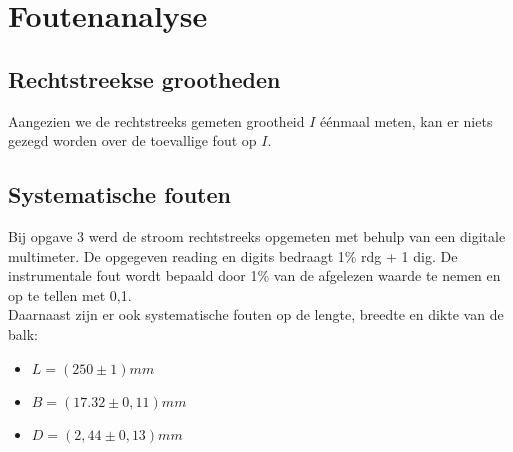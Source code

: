 \section{Foutenanalyse}
\subsection{Rechtstreekse grootheden}
Aangezien we de rechtstreeks gemeten grootheid $I$ éénmaal meten, kan er niets gezegd worden over de toevallige fout op $I$.
\subsection{Systematische fouten}
Bij opgave 3 werd de stroom rechtstreeks opgemeten met behulp van een digitale multimeter.
De opgegeven reading en digits bedraagt 1\% rdg + 1 dig.
De instrumentale fout wordt bepaald door 1\% van de afgelezen waarde te nemen en op te tellen met 0,1.
\\
Daarnaast zijn er ook systematische fouten op de lengte, breedte en dikte van de balk:
\begin{itemize}
    \item $L = (250 \pm 1)mm$
    \item $B = (17.32 \pm 0,11)mm$
    \item $D = (2,44 \pm 0,13)mm$
\end{itemize}
